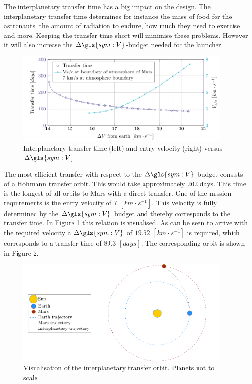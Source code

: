 The interplanetary transfer time has a big impact on the design. The interplanetary transfer time determines for instance the mass of food for the astronauts, the amount of radiation to endure, how much they need to exercise and more. Keeping the transfer time short will minimise these problems. However it will also increase the $\Delta\gls{sym:V}$-budget needed for the launcher. 

\begin{figure}[h]
	\centering
	\includegraphics[width=0.95\textwidth]{Figure/Inter_transfer/transfer_time.pdf}
	\caption[Interplanetary transfer time and entry velocity versus $\Delta\gls{sym:V}$]{Interplanetary transfer time (left) and entry velocity (right) versus $\Delta\gls{sym:V}$}
	\label{fig:inter_time}
\end{figure}

The most efficient transfer with respect to the $\Delta\gls{sym:V}$-budget consists of a Hohmann transfer orbit. This would take approximately 262 days. This time is the longest of all orbits to Mars with a direct transfer. One of the mission requirements is the entry velocity of 7 $\left[km \cdot s^{-1}\right]$. This velocity is fully determined by the $\Delta \gls{sym:V}$ budget and thereby corresponds to the transfer time. In Figure \ref{fig:inter_time} this relation is visualised. As can be seen to arrive with the required velocity a $\Delta \gls{sym:V}$ of $19.62$ $\left[km \cdot s^{-1}\right]$ is required, which corresponds to a transfer time of $89.3$ $\left[days\right]$. The corresponding orbit is shown in Figure \ref{fig:inter_orbit}.

\begin{figure}[h]
	\centering
	\includegraphics[width=0.95\textwidth]{Figure/Inter_transfer/orbits.pdf}
	\caption[Visualisation of the interplanetary transfer orbit]{Visualisation of the interplanetary transfer orbit. Planets not to scale}
	\label{fig:inter_orbit}
\end{figure}
